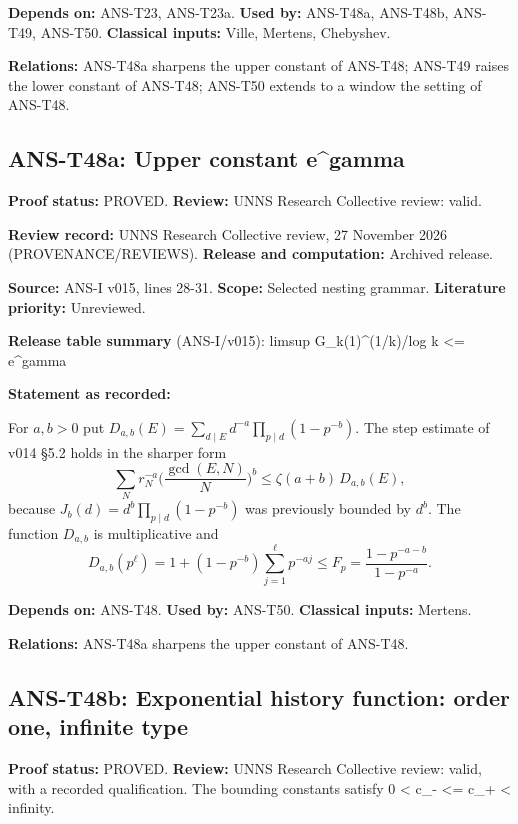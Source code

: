 \documentclass[
  11pt,
]{article}
\begin{document}
\textbf{Depends on:} ANS-T23, ANS-T23a. \textbf{Used by:} ANS-T48a,
ANS-T48b, ANS-T49, ANS-T50. \textbf{Classical inputs:} Ville, Mertens,
Chebyshev.

\textbf{Relations:} ANS-T48a sharpens the upper constant of ANS-T48;
ANS-T49 raises the lower constant of ANS-T48; ANS-T50 extends to a
window the setting of ANS-T48.

\hypertarget{ans-t48a-upper-constant-egamma}{%
\subsection{ANS-T48a: Upper constant
e\^{}gamma}\label{ans-t48a-upper-constant-egamma}}

\textbf{Proof status:} PROVED. \textbf{Review:} UNNS Research Collective
review: valid.

\textbf{Review record:} UNNS Research Collective review, 27 November
2026 (PROVENANCE/REVIEWS). \textbf{Release and computation:} Archived
release.

\textbf{Source:} ANS-I v015, lines 28-31. \textbf{Scope:} Selected
nesting grammar. \textbf{Literature priority:} Unreviewed.

\textbf{Release table summary} (ANS-I/v015): limsup G\_k(1)\^{}(1/k)/log
k \textless= e\^{}gamma

\textbf{Statement as recorded:}

For \(a,b>0\) put
\(D_{a,b}(E)=\sum_{d\mid E}d^{-a}\prod_{p\mid d}(1-p^{-b})\). The step
estimate of v014 §5.2 holds in the sharper form
\[\sum_Nr_N^{-a}\Big(\frac{\gcd(E,N)}N\Big)^b\le\zeta(a+b)\,D_{a,b}(E),\]
because \(J_b(d)=d^b\prod_{p\mid d}(1-p^{-b})\) was previously bounded
by \(d^b\). The function \(D_{a,b}\) is multiplicative and
\[D_{a,b}(p^{\ell})=1+(1-p^{-b})\sum_{j=1}^{\ell}p^{-aj}\le F_p=\frac{1-p^{-a-b}}{1-p^{-a}} .\]

\textbf{Depends on:} ANS-T48. \textbf{Used by:} ANS-T50.
\textbf{Classical inputs:} Mertens.

\textbf{Relations:} ANS-T48a sharpens the upper constant of ANS-T48.

\hypertarget{ans-t48b-exponential-history-function-order-one-infinite-type}{%
\subsection{ANS-T48b: Exponential history function: order one, infinite
type}\label{ans-t48b-exponential-history-function-order-one-infinite-type}}

\textbf{Proof status:} PROVED. \textbf{Review:} UNNS Research Collective
review: valid, with a recorded qualification. The bounding constants
satisfy 0 \textless{} c\_- \textless= c\_+ \textless{} infinity.
\end{document}
